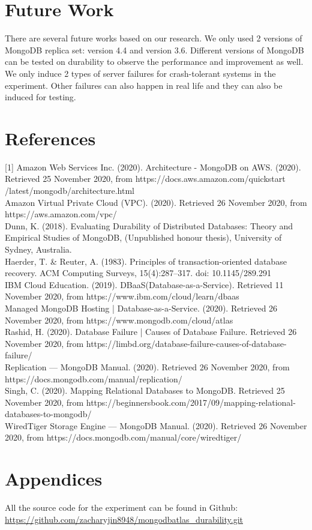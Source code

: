 \documentclass[12pt]{article}
\begin{document}
\section{Future Work}
There are several future works based on our research. We only used 2 versions of MongoDB replica set: version 4.4 and version 3.6. Different versions of MongoDB can be tested on durability to observe the performance and improvement as well. We only induce 2 types of server failures for crash-tolerant systems in the experiment. Other failures can also happen in real life and they can also be induced for testing.\\
\section{References}
\label{sec:reference}

[1] Amazon Web Services Inc. (2020). Architecture - MongoDB on AWS. (2020). Retrieved 25 November 2020, from https://docs.aws.amazon.com/quickstart
/latest/mongodb/architecture.html\\\relax
[2] Amazon Virtual Private Cloud (VPC). (2020). Retrieved 26 November 2020, from https://aws.amazon.com/vpc/ \\\relax
[3] Dunn, K. (2018). Evaluating Durability of Distributed
Databases: Theory and Empirical Studies of MongoDB, (Unpublished honour thesis), University of Sydney, Australia.\\\relax
[4] Haerder, T. \& Reuter, A. (1983). Principles of transaction-oriented database recovery. ACM Computing Surveys, 15(4):287–317. doi: 10.1145/289.291 \\\relax
[5] IBM Cloud Education. (2019). DBaaS(Database-as-a-Service). Retrieved 11 November 2020, from https://www.ibm.com/cloud/learn/dbaas \\\relax
[6] Managed MongoDB Hosting | Database-as-a-Service. (2020). Retrieved 26 November 2020, from https://www.mongodb.com/cloud/atlas \\\relax
[7] Rashid, H. (2020). Database Failure | Causes of Database Failure. Retrieved 26 November 2020, from https://limbd.org/database-failure-causes-of-database-failure/ \\\relax
[8] Replication — MongoDB Manual. (2020). Retrieved 26 November 2020, from https://docs.mongodb.com/manual/replication/ \\\relax
[9] Singh, C. (2020). Mapping Relational Databases to MongoDB. Retrieved 25 November 2020, from https://beginnersbook.com/2017/09/mapping-relational-databases-to-mongodb/ \\\relax
[10] WiredTiger Storage Engine — MongoDB Manual. (2020). Retrieved 26 November 2020, from https://docs.mongodb.com/manual/core/wiredtiger/ \\\relax

\section{Appendices}
All the source code for the experiment can be found in Github:\\
\href{https://github.com/zacharyjin8948/mongodbatlas\_durability.git}{https://github.com/zacharyjin8948/mongodbatlas\_durability.git}
\end{document}
